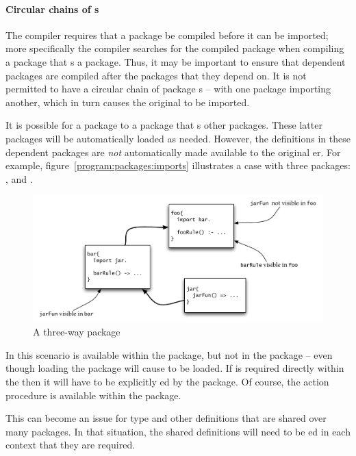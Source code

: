 \paragraph{Circular chains of s}
The \go compiler requires that a package be compiled before it can be imported; more specifically the compiler searches for the compiled package when compiling a package that s a package. Thus, it may be important to ensure that dependent packages are compiled after the packages that they depend on. It is not permitted to have a circular chain of package s -- with one package importing another, which in turn causes the original to be imported.

It is possible for a package to  a package that s other packages. These latter packages will be automatically loaded as needed. However, the definitions in these dependent packages are \emph{not} automatically made available to the original er. For example, figure~\vref{program:packages:imports} illustrates a case with three packages: ,  and .
\begin{figure}
\begin{boxed}
\includegraphics[width=\textwidth]{packages}
\end{boxed}
\caption{\label{program:packages:imports}A three-way package }
\end{figure}
In this scenario  is available within the  package, but not in the  package -- even though loading the  package will cause  to be loaded. If  is required directly within the  then it will have to be explicitly ed by the  package. Of course, the  action procedure is available within the  package.

This can become an issue for type and other definitions that are shared over many packages. In that situation, the shared definitions will need to be ed in each context that they are required.

